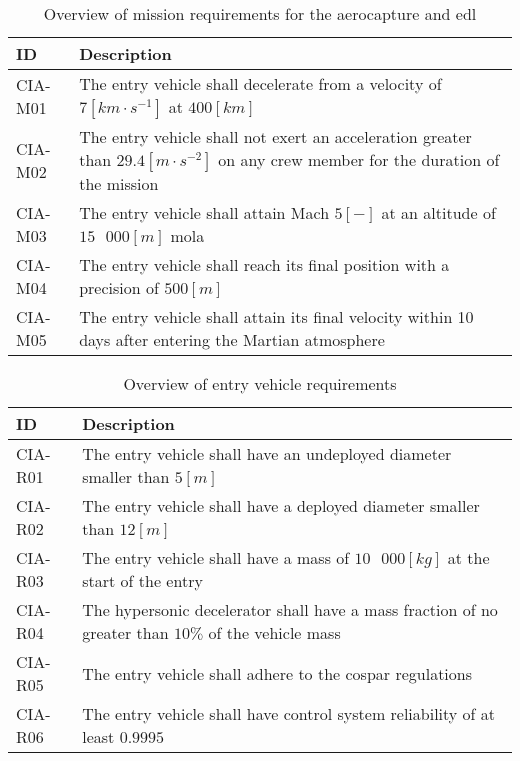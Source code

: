 \begin{table}[h]
	\caption[Overview of mission requirements for the aerocapture and \acrlong{edl}]{Overview of mission requirements for the aerocapture and \gls{edl}}
	\label{tab:misreq} 
	\begin{tabular}{|p{}|p{}|}
    \hline
    \textbf{ID}          & \textbf{Description}                                                                                                      \\ \hline \hline
    CIA-M01& The entry vehicle shall decelerate from a velocity of $7 \left[km\cdot s ^{-1}\right]$ at $400 \left[km\right]$  \\ \hline
    CIA-M02 & The entry vehicle shall not exert an acceleration greater than $29.4 \left[ m \cdot s^{-2}\right]$ on any crew member for the duration of the mission			\\ \hline
    	CIA-M03 & The entry vehicle shall attain Mach $5 [-]$ at an altitude of $15\mbox{ }000 [m]$  \gls{mola} \\ \hline
    	CIA-M04 & The entry vehicle shall reach its final position with a precision of $500 \left[m\right]$\\ \hline
    	CIA-M05 & The entry vehicle shall attain its final velocity within 10 days after entering the Martian atmosphere \\ \hline
    \end{tabular}
\end{table}

\begin{table}[h]
	\caption{Overview of entry vehicle requirements} 
	\label{tab:vehreq}
	\begin{tabular}{|p{}|p{}|}
		\hline
		\textbf{ID}          & \textbf{Description}                                                                                                     \\ \hline \hline
		CIA-R01 & The entry vehicle shall have an undeployed diameter smaller than $5 \left[m\right]$                         				            \\ \hline
		CIA-R02 & The entry vehicle shall have a deployed diameter smaller than $12 \left[m\right]$                         				            \\ \hline	
		CIA-R03 & The entry vehicle shall have a mass of $10\mbox{ }000 \left[kg\right]$ at the start of the entry                       				            \\ \hline
		CIA-R04 & The hypersonic decelerator shall have a mass fraction of no greater than $10\%$ of the vehicle mass  \\ \hline
		CIA-R05 &  The entry vehicle shall adhere to the \gls{cospar} regulations \\ \hline
		CIA-R06 &  The entry vehicle shall have control system reliability of at least $0.9995$  \\ \hline
	\end{tabular}
\end{table}